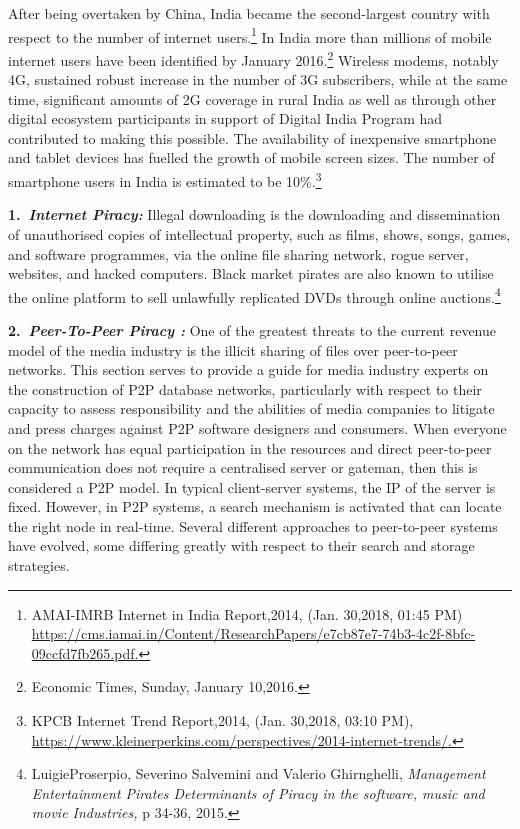 \begin{multicols}{2}
\vspace{-.1cm}

\noi
After being overtaken by China, India became the second-largest country with respect to the
number of internet users.\footnote{AMAI-IMRB Internet in India Report,2014, (Jan. 30,2018, 01:45 PM)\\
 \url{https://cms.iamai.in/Content/ResearchPapers/e7cb87e7-74b3-4c2f-8bfc-09ccfd7fb265.pdf.}} In India more than millions of mobile internet users have been identified by January 2016.\footnote{Economic Times, Sunday, January 10,2016.} Wireless modems, notably 4G, sustained robust increase in the number of 3G subscribers, while at the same time, significant amounts of 2G coverage in
rural India as well as through other digital ecosystem participants in support of Digital India
Program had contributed to making this possible. The availability of inexpensive smartphone
and tablet devices has fuelled the growth of mobile screen sizes. The number of smartphone
users in India is estimated to be 10\%.\footnote{KPCB Internet Trend Report,2014, (Jan. 30,2018, 03:10 PM), \url{https://www.kleinerperkins.com/perspectives/2014-internet-trends/.}}


\noi
{\large \bfseries 1.~\textit{Internet Piracy:}}  Illegal downloading is the downloading and dissemination of unauthorised
copies of intellectual property, such as films, shows, songs, games, and software
programmes, via the online file sharing network, rogue server, websites, and hacked
computers. Black market pirates are also known to utilise the online platform to sell
unlawfully replicated DVDs through online auctions.\footnote{LuigieProserpio, Severino Salvemini and Valerio Ghirnghelli, \textit{Management Entertainment Pirates Determinants of Piracy in the software, music and movie Industries,} p 34-36, 2015.}

\vspace{-.15cm}

\noi
{\large \bfseries 2.~\textit{Peer-To-Peer Piracy :}} One of the greatest threats to the current revenue model of the media
industry is the illicit sharing of files over peer-to-peer networks. This section serves to
provide a guide for media industry experts on the construction of P2P database networks,
particularly with respect to their capacity to assess responsibility and the abilities of media
companies to litigate and press charges against P2P software designers and consumers. When
everyone on the network has equal participation in the resources and direct peer-to-peer
communication does not require a centralised server or gateman, then this is considered a P2P
model. In typical client-server systems, the IP of the server is fixed. However, in P2P
systems, a search mechanism is activated that can locate the right node in real-time. Several
different approaches to peer-to-peer systems have evolved, some differing greatly with
respect to their search and storage strategies.


\end{multicols}
